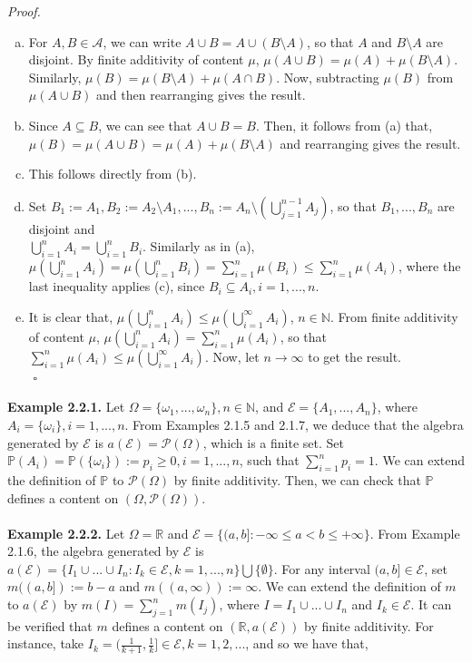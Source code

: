 \documentclass{article}
\begin{document}
\textit{Proof.}
\begin{enumerate}[(a)]
	\item For $A,B \in \mathcal{A}$, we can write $A \cup B = A \cup (B \setminus A)$, so that $A$ and $B \setminus A$ are disjoint. By finite additivity of content $\mu$, $\mu(A \cup B) = \mu(A) + \mu(B \setminus A)$. Similarly, $\mu(B) = \mu(B \setminus A) + \mu(A \cap B)$. Now, subtracting $\mu(B)$ from $\mu(A \cup B)$ and then rearranging gives the result.
	\item Since $A \subseteq B$, we can see that $A \cup B = B$. Then, it follows from (a) that, \\ $\mu(B) = \mu(A \cup B) = \mu(A) + \mu(B \setminus A)$ and rearranging gives the result.
	\item This follows directly from (b).
	\item Set $B_1:= A_1, B_2:= A_2 \setminus A_1, ..., B_n:= A_n \setminus (\bigcup_{j=1}^{n-1}A_{j})$, so that $B_1,...,B_n$ are disjoint and \\ $\bigcup_{i=1}^{n}A_i = \bigcup_{i=1}^{n}B_i$. Similarly as in (a), $\mu(\bigcup_{i=1}^{n}A_i) = \mu(\bigcup_{i=1}^{n}B_i) = \sum_{i=1}^{n}\mu(B_i) \leq \sum_{i=1}^{n}\mu(A_i)$, where the last inequality applies (c), since $B_i \subseteq A_i, i=1,...,n$.
	\item It is clear that, $\mu(\bigcup_{i=1}^{n}A_i) \leq \mu(\bigcup_{i=1}^{\infty}A_i)$, $n \in \mathbb{N}$. From finite additivity of content $\mu$, $\mu(\bigcup_{i=1}^{n}A_i) = \sum_{i=1}^{n}\mu(A_i)$, so that $\sum_{i=1}^{n}\mu(A_i) \leq \mu(\bigcup_{i=1}^{\infty}A_i)$. Now, let $n \to \infty$ to get the result. \\ ${}$ \hfill $\square$
\end{enumerate}
\textbf{Example 2.2.1.} Let $\Omega = \{\omega_1,...,\omega_n\}, n \in \mathbb{N}$, and $\mathcal{E} = \{A_1,...,A_n\}$, where $A_i = \{\omega_i\}, i=1,...,n$. From Examples 2.1.5 and 2.1.7, we deduce that the algebra generated by $\mathcal{E}$ is $a(\mathcal{E}) = \mathcal{P}(\Omega)$, which is a finite set. Set $\mathbb{P}(A_i) = \mathbb{P}(\{\omega_i\}) := p_i \geq 0, i=1,...,n$, such that $\sum_{i=1}^{n}p_i = 1$. We can extend the definition of $\mathbb{P}$ to $\mathcal{P}(\Omega)$ by finite additivity. Then, we can check that $\mathbb{P}$ defines a content on $(\Omega, \mathcal{P}(\Omega))$. \\\\
\textbf{Example 2.2.2.} Let $\Omega = \mathbb{R}$ and $\mathcal{E} = \{(a,b]: -\infty \leq a < b \leq +\infty\}$. From Example 2.1.6, the algebra generated by $\mathcal{E}$ is $a(\mathcal{E}) = \{I_1 \cup ... \cup I_n: I_k \in \mathcal{E}, k=1,...,n\} \bigcup \{\emptyset\}$. For any interval $(a,b] \in \mathcal{E}$, set $m((a,b]) := b-a$ and $m((a,\infty)) := \infty$. We can extend the definition of $m$ to $a(\mathcal{E})$ by $m(I) = \sum_{j=1}^{n}m(I_j)$, where $I = I_1 \cup ... \cup I_n$ and $I_k \in \mathcal{E}$. It can be verified that $m$ defines a content on $(\mathbb{R},a(\mathcal{E}))$ by finite additivity. For instance, take $I_k = (\frac{1}{k+1},\frac{1}{k}] \in \mathcal{E}, k = 1,2,...$, and so we have that,
\end{document}
